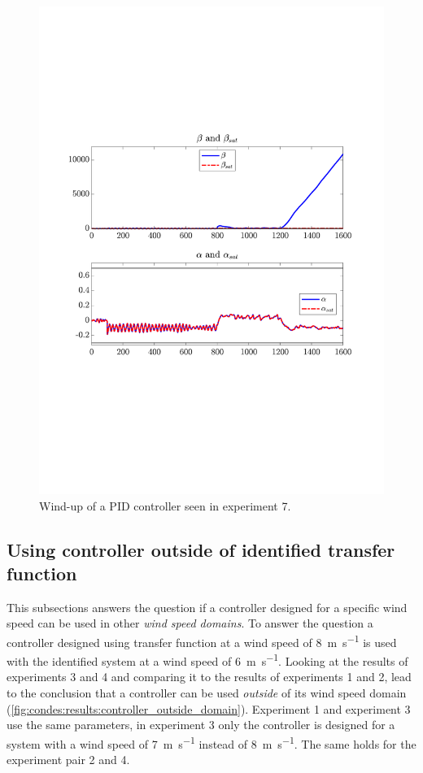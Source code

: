 \begin{figure}[H]
    \center
    \includegraphics[width=0.7\linewidth, trim=50 230 55 180,clip]{fig/Open_loop/exp_7_in.pdf}
    \caption{Wind-up of a PID controller seen in experiment 7.}
    \label{fig:condes:results:wind_up}
\end{figure}


\subsection{Using controller outside of identified transfer function}

This subsections answers the question if a controller designed for a specific wind speed can be used in other \textit{wind speed domains}.
To answer the question a controller designed using transfer function at a wind speed of \SI{8}{\metre\per\second} is used with the identified system at a wind speed of \SI{6}{\meter\per\second}.
Looking at the results of experiments 3 and 4 and comparing it to the results of experiments 1 and 2, lead to the conclusion that a controller can be used \textit{outside} of its wind speed domain (\autoref{fig:condes:results:controller_outside_domain}).
Experiment 1 and experiment 3 use the same parameters, in experiment 3 only the controller is designed for a system with a wind speed of \SI{7}{\metre\per\second} instead of \SI{8}{\metre\per\second}.
The same holds for the experiment pair 2 and 4.

